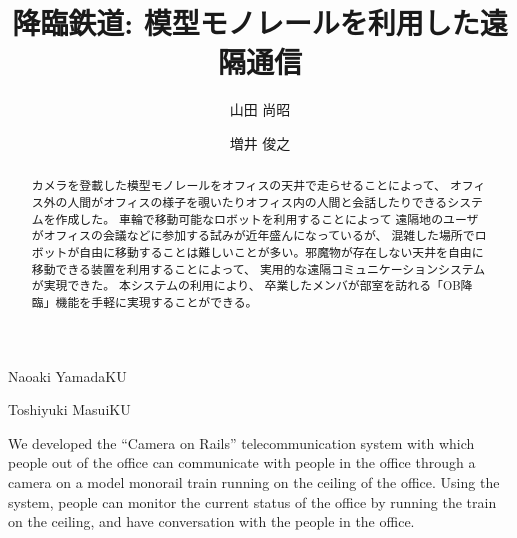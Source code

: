 \documentclass[submit,techreq]{ipsj}
\begin{document}
\title{降臨鉄道: 模型モノレールを利用した遠隔通信}


\author{山田 尚昭}{Naoaki Yamada}{KU}
\author{増井 俊之}{Toshiyuki Masui}{KU}

\begin{abstract}

カメラを登載した模型モノレールをオフィスの天井で走らせることによって、
オフィス外の人間がオフィスの様子を覗いたりオフィス内の人間と会話したりできるシステムを作成した。
車輪で移動可能なロボットを利用することによって
遠隔地のユーザがオフィスの会議などに参加する試みが近年盛んになっているが、
混雑した場所でロボットが自由に移動することは難しいことが多い。邪魔物が存在しない天井を自由に移動できる装置を利用することによって、
実用的な遠隔コミュニケーションシステムが実現できた。
本システムの利用により、
卒業したメンバが部室を訪れる「OB降臨」機能を手軽に実現することができる。
\end{abstract}

%
\begin{eabstract}
We developed the ``Camera on Rails'' telecommunication system with
which people out of the office can communicate with people in the
office through a camera on a model monorail train running on the ceiling
of the office. Using the system, people can monitor the current status
of the office by running the train on the ceiling, and have
conversation with the people in the office.
\end{eabstract}
%

\maketitle
\end{document}
